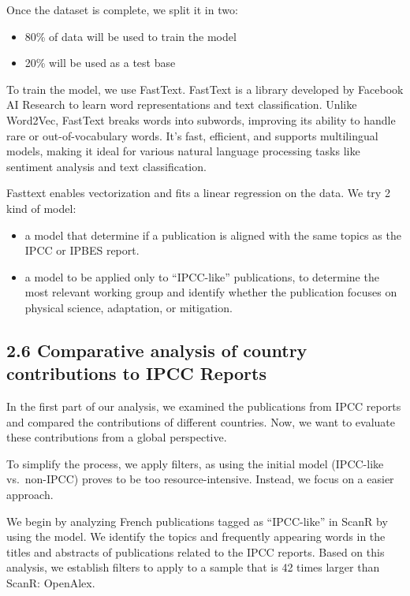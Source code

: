 \documentclass[
]{article}
\providecommand{\tightlist}{%
  \setlength{\itemsep}{0pt}\setlength{\parskip}{0pt}}
\begin{document}
Once the dataset is complete, we split it in two:

\begin{itemize}
\tightlist
\item
  80\% of data will be used to train the model
\item
  20\% will be used as a test base
\end{itemize}

To train the model, we use FastText. FastText is a library developed by
Facebook AI Research to learn word representations and text
classification. Unlike Word2Vec, FastText breaks words into subwords,
improving its ability to handle rare or out-of-vocabulary words. It's
fast, efficient, and supports multilingual models, making it ideal for
various natural language processing tasks like sentiment analysis and
text classification.

Fasttext enables vectorization and fits a linear regression on the data.
We try 2 kind of model:

\begin{itemize}
\tightlist
\item
  a model that determine if a publication is aligned with the same
  topics as the IPCC or IPBES report.
\item
  a model to be applied only to ``IPCC-like'' publications, to determine
  the most relevant working group and identify whether the publication
  focuses on physical science, adaptation, or mitigation.
\end{itemize}

\hypertarget{comparative-analysis-of-country-contributions-to-ipcc-reports}{%
\subsection{2.6 Comparative analysis of country contributions to IPCC
Reports}\label{comparative-analysis-of-country-contributions-to-ipcc-reports}}

In the first part of our analysis, we examined the publications from
IPCC reports and compared the contributions of different countries. Now,
we want to evaluate these contributions from a global perspective.

To simplify the process, we apply filters, as using the initial model
(IPCC-like vs.~non-IPCC) proves to be too resource-intensive. Instead,
we focus on a easier approach.

We begin by analyzing French publications tagged as ``IPCC-like'' in
ScanR by using the model. We identify the topics and frequently
appearing words in the titles and abstracts of publications related to
the IPCC reports. Based on this analysis, we establish filters to apply
to a sample that is 42 times larger than ScanR: OpenAlex.
\end{document}
